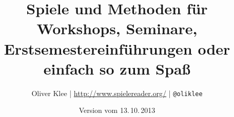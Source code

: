 \documentclass[a4paper,twoside,11pt,titlepage,openany]{scrbook}
\author{\raggedright Oliver Klee | \url{http://www.spielereader.org/} | \texttt{@oliklee}}
\title{Spiele und Methoden für Workshops, Seminare, Erstsemestereinführungen oder einfach so zum Spaß}
\date{Version vom 13.\,10.\,2013}
\begin{document}
\nocite*{}

\frontmatter
\maketitle
\tableofcontents

\mainmatter











\backmatter


\appendix


\printindex
\end{document}
